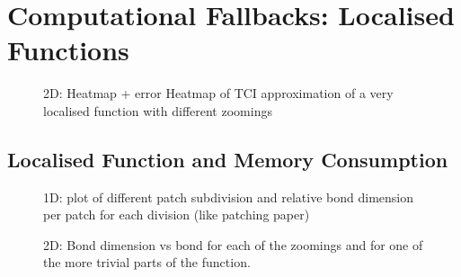 \section{Computational Fallbacks: Localised Functions}

\begin{figure}[ht!]
	\caption{2D: Heatmap + error Heatmap of TCI approximation of a very localised function with different zoomings  }
\end{figure}

\subsection{Localised Function and Memory Consumption}

\begin{figure}[ht!]
	\caption{1D: plot of different patch subdivision and relative bond dimension per patch for each division (like patching paper)  }
\end{figure}

\begin{figure}[ht!]
	\caption{2D: Bond dimension vs bond for each of the zoomings and for one of the more trivial parts of the function. }
\end{figure}

